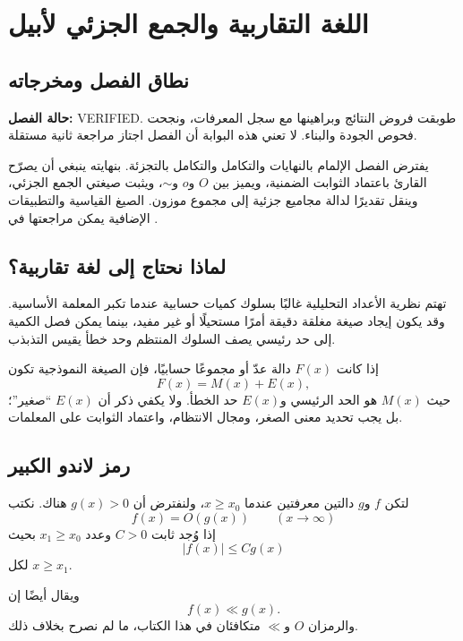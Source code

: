 \chapter{اللغة التقاربية والجمع الجزئي لأبيل}

\section{نطاق الفصل ومخرجاته}

\noindent\textbf{حالة الفصل:} \textenglish{VERIFIED}. طوبقت فروض النتائج
وبراهينها مع سجل المعرفات، ونجحت فحوص الجودة والبناء. لا تعني هذه البوابة
أن الفصل اجتاز مراجعة ثانية مستقلة.

يفترض الفصل الإلمام بالنهايات والتكامل والتكامل بالتجزئة. بنهايته ينبغي
أن يصرّح القارئ باعتماد الثوابت الضمنية، ويميز بين \(O\) و\(o\)
و\(\sim\)، ويثبت صيغتي الجمع الجزئي، وينقل تقديرًا لدالة مجاميع جزئية
إلى مجموع موزون. الصيغ القياسية والتطبيقات الإضافية يمكن مراجعتها في
\cite{Apostol1976,Davenport2000}.

\section{لماذا نحتاج إلى لغة تقاربية؟}

تهتم نظرية الأعداد التحليلية غالبًا بسلوك كميات حسابية عندما تكبر المعلمة الأساسية. وقد يكون إيجاد صيغة مغلقة دقيقة أمرًا مستحيلًا أو غير مفيد، بينما يمكن فصل الكمية إلى حد رئيسي يصف السلوك المنتظم وحد خطأ يقيس التذبذب.

إذا كانت \(F(x)\) دالة عدّ أو مجموعًا حسابيًا، فإن الصيغة النموذجية تكون
\[
F(x)=M(x)+E(x),
\]
حيث \(M(x)\) هو الحد الرئيسي و\(E(x)\) حد الخطأ. ولا يكفي ذكر أن \(E(x)\) ``صغير''؛ بل يجب تحديد معنى الصغر، ومجال الانتظام، واعتماد الثوابت على المعلمات.

\section{رمز لاندو الكبير}

\begin{definition}
لتكن \(f\) و\(g\) دالتين معرفتين عندما \(x\geq x_0\)، ولنفترض أن \(g(x)>0\) هناك. نكتب
\[
f(x)=O(g(x))
\qquad (x\to\infty)
\]
إذا وُجد ثابت \(C>0\) وعدد \(x_1\geq x_0\) بحيث
\[
|f(x)|\leq Cg(x)
\]
لكل \(x\geq x_1\).
\end{definition}

ويقال أيضًا إن
\[
f(x)\ll g(x).
\]
والرمزان \(O\) و\(\ll\) متكافئان في هذا الكتاب، ما لم نصرح بخلاف ذلك.

